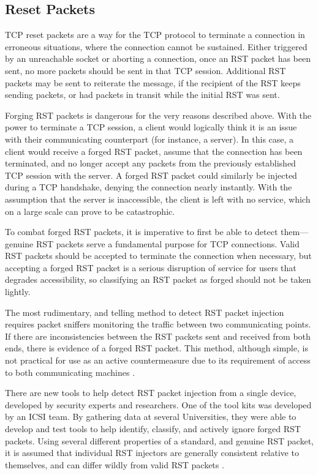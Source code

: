 \documentclass[journal]{IEEEtran}
\begin{document}
\subsection{Reset Packets}
TCP reset packets are a way for the TCP protocol to terminate a connection in erroneous situations, where the connection cannot be sustained. Either triggered by an unreachable socket or aborting a connection, once an RST packet has been sent, no more packets should be sent in that TCP session. Additional RST packets may be sent to reiterate the message, if the recipient of the RST keeps sending packets, or had packets in transit while the initial RST was sent.

Forging RST packets is dangerous for the very reasons described above. With the power to terminate a TCP session, a client would logically think it is an issue with their communicating counterpart (for instance, a server). In this case, a client would receive a forged RST packet, assume that the connection has been terminated, and no longer accept any packets from the previously established TCP session with the server. A forged RST packet could similarly be injected during a TCP handshake, denying the connection nearly instantly. With the assumption that the server is inaccessible, the client is left with no service, which on a large scale can prove to be catastrophic.

To combat forged RST packets, it is imperative to first be able to detect them---genuine RST packets serve a fundamental purpose for TCP connections. Valid RST packets should be accepted to terminate the connection when necessary, but accepting a forged RST packet is a serious disruption of service for users that degrades accessibility, so classifying an RST packet as forged should not be taken lightly.

The most rudimentary, and telling method to detect RST packet injection requires packet sniffers monitoring the traffic between two communicating points. If there are inconsistencies between the RST packets sent and received from both ends, there is evidence of a forged RST packet. This method, although simple, is not practical for use as an active countermeasure due to its requirement of access to both communicating machines \cite{rstdetection}.

There are new tools to help detect RST packet injection from a single device, developed by security experts and researchers. One of the tool kits was developed by an ICSI team. By gathering data at several Universities, they were able to develop and test tools to help identify, classify, and actively ignore forged RST packets. Using several different properties of a standard, and genuine RST packet, it is assumed that individual RST injectors are generally consistent relative to themselves, and can differ wildly from valid RST packets \cite{rstdetection}.
\end{document}
